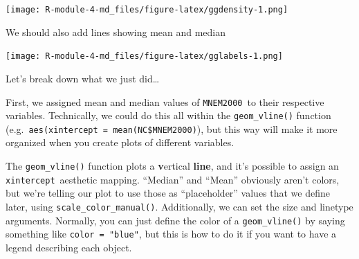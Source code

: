 \documentclass[
]{article}
\newenvironment{Shaded}{\begin{snugshade}}{\end{snugshade}}
\newcommand{\AttributeTok}[1]{\textcolor[rgb]{0.77,0.63,0.00}{#1}}
\newcommand{\DecValTok}[1]{\textcolor[rgb]{0.00,0.00,0.81}{#1}}
\newcommand{\FunctionTok}[1]{\textcolor[rgb]{0.00,0.00,0.00}{#1}}
\newcommand{\NormalTok}[1]{#1}
\newcommand{\OtherTok}[1]{\textcolor[rgb]{0.56,0.35,0.01}{#1}}
\newcommand{\SpecialCharTok}[1]{\textcolor[rgb]{0.00,0.00,0.00}{#1}}
\newcommand{\StringTok}[1]{\textcolor[rgb]{0.31,0.60,0.02}{#1}}
\begin{document}
\texttt{[image: R-module-4-md\_files/figure-latex/ggdensity-1.png]}

We should also add lines showing mean and median

\begin{Shaded}
\end{Shaded}

\texttt{[image: R-module-4-md\_files/figure-latex/gglabels-1.png]}

Let's break down what we just did\ldots{}

First, we assigned mean and median values of \texttt{MNEM2000}~to their
respective variables. Technically, we could do this all within the
\texttt{geom\_vline()} function
(e.g.~\texttt{aes(xintercept\ =\ mean(NC\$MNEM2000)}), but this way will
make it more organized when you create plots of different variables.

The \texttt{geom\_vline()} function plots a \textbf{v}ertical
\textbf{line}, and it's possible to assign an
\texttt{xintercept}~aesthetic mapping. ``Median'' and ``Mean'' obviously
aren't colors, but we're telling our plot to use those as
``placeholder'' values that we define later, using
\texttt{scale\_color\_manual()}. Additionally, we can set the size and
linetype arguments. Normally, you can just define the color of a
\texttt{geom\_vline()} by saying something like
\texttt{color\ =\ "blue"}, but this is how to do it if you want to have
a legend describing each object.
\end{document}
